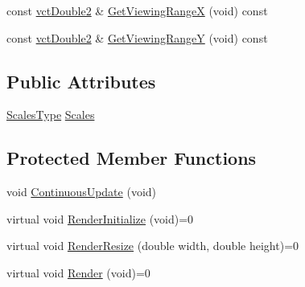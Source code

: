 {\bf }\par
\begin{DoxyCompactItemize}
\item 
const \hyperlink{vct_fixed_size_vector_types_8h_afc0fdcc41cbe8b043747612501610812}{vct\-Double2} \& \hyperlink{classvct_plot2_d_base_aded2fefaf32d6d3d299c2dd0e833d32a}{Get\-Viewing\-Range\-X} (void) const 
\item 
const \hyperlink{vct_fixed_size_vector_types_8h_afc0fdcc41cbe8b043747612501610812}{vct\-Double2} \& \hyperlink{classvct_plot2_d_base_a9fd9f4facf8c08c2d2ed44a141f99a48}{Get\-Viewing\-Range\-Y} (void) const 
\end{DoxyCompactItemize}

\subsection*{Public Attributes}
\begin{DoxyCompactItemize}
\item 
\hyperlink{classvct_plot2_d_base_a0f7274ebd354a06e7102b164f60b7d94}{Scales\-Type} \hyperlink{classvct_plot2_d_base_a614a16e1e6f461d76aeba5daf4525b08}{Scales}
\end{DoxyCompactItemize}
\subsection*{Protected Member Functions}
\begin{DoxyCompactItemize}
\item 
void \hyperlink{classvct_plot2_d_base_afce628827d8e62844c7219ee4ed1cc6e}{Continuous\-Update} (void)
\end{DoxyCompactItemize}
{\bf }\par
\begin{DoxyCompactItemize}
\item 
virtual void \hyperlink{classvct_plot2_d_base_ab2287bbdcb6b39903716a573f0bc6a70}{Render\-Initialize} (void)=0
\item 
virtual void \hyperlink{classvct_plot2_d_base_a7bba3cf050792375d7ce02fc87f3756e}{Render\-Resize} (double width, double height)=0
\item 
virtual void \hyperlink{classvct_plot2_d_base_af17c67a35ecebb9a41159fe936237a09}{Render} (void)=0
\end{DoxyCompactItemize}

